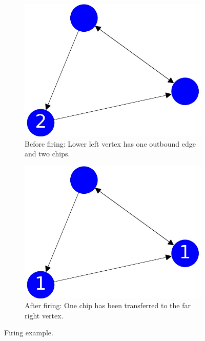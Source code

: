 \documentclass{beamer}
\begin{document}
\begin{frame}
\frametitle{}


\begin{figure}[h!]
  \centering
  \begin{subfigure}[b]{0.4\linewidth}
    \includegraphics[width=\linewidth]{sandpile_simple_0}
    \caption{Before firing: Lower left vertex has one outbound edge and two chips.}
  \end{subfigure}
  \begin{subfigure}[b]{0.4\linewidth}
    \includegraphics[width=\linewidth]{sandpile_simple_1}
    \caption{After firing: One chip has been transferred to the far right vertex.}
  \end{subfigure}
  \caption{Firing example.}
  \label{fig:coffee}
\end{figure}

\end{frame}
\end{document}
